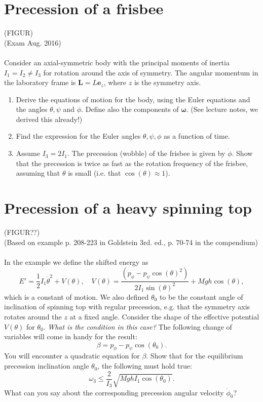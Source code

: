 \documentclass{article}
\begin{document}
    \section{Precession of a frisbee}
    (FIGUR) \\
    (Exam Aug. 2016) \\ \\
    Consider an axial-symmetric body with the principal moments of inertia $I_1 = I_2 \neq I_3$ for rotation around the axis of symmetry. The angular momentum in the laboratory frame is $\mathbf{L} = L \mathbf{e}_z$, where $z$ is the symmetry axis. 
    \begin{enumerate}[label=(\alph*)]
        \item Derive the equations of motion for the body, using the Euler equations and the angles $\theta, \psi$ and $\phi$. Define also the components of $\boldsymbol{\omega}$. (See lecture notes, we derived this already!)
        \item Find the expression for the Euler angles $\theta, \psi, \phi$ as a function of time.
        \item Assume $I_3 = 2I_1$. The precession (wobble) of the frisbee is given by $\dot \phi$. Show that the precession is twice as fast as the rotation frequency of the frisbee, assuming that $\theta$ is small (i.e. that $\cos(\theta) \approx 1$).
    \end{enumerate}

    \section{Precession of a heavy spinning top}
    (FIGUR??)\\
    (Based on example p. 208-223 in Goldstein 3rd. ed., p. 70-74 in the compendium)\\ \\
    In the example we define the shifted energy as 
    \begin{equation*}
        E' = \frac{1}{2}I_1 \dot \theta^2 + V(\theta), \quad V(\theta) = \frac{(p_\phi - p_\psi \cos(\theta)^2)}{2I_1\sin(\theta)^2} + Mgh\cos(\theta),
    \end{equation*}
    which is a constant of motion. We also defined $\theta_0$ to be the constant angle of inclination of spinning top with regular precession, e.g. that the symmetry axis rotates around the $z$ at a fixed angle. Consider the shape of the effective potential $V(\theta)$ for $\theta_0$. \emph{What is the condition in this case?} The following change of variables will come in handy for the result:
    \begin{equation*}
        \beta = p_\phi - p_\psi \cos(\theta_0).
    \end{equation*}
    You will encounter a quadratic equation for $\beta$. Show that for the equilibrium precession inclination angle $\theta_0$, the following must hold true:
    \begin{equation*}
        \omega_3 \le \frac{2}{I_3}\sqrt{MghI_1 \cos(\theta_0) }.
    \end{equation*}
    What can you say about the corresponding precession angular velocity $\dot \phi_0$?
\end{document}
